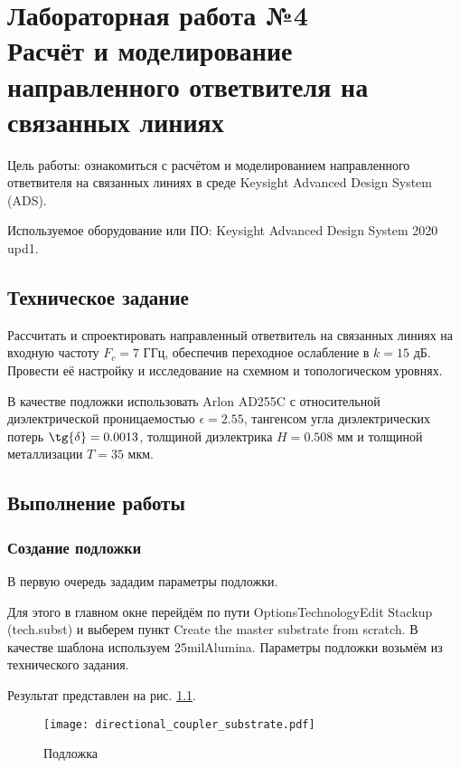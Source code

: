\chapter{Лабораторная работа №4 \\
Расчёт и моделирование направленного ответвителя на связанных линиях}

Цель работы: ознакомиться с расчётом и моделированием направленного ответвителя на связанных линиях в среде Keysight Advanced Design System (ADS).

Используемое оборудование или ПО: Keysight Advanced Design System 2020 upd1.

\section{Техническое задание}

Рассчитать и спроектировать направленный ответвитель на связанных линиях на входную частоту $F_c = 7 \text{~ГГц}$, обеспечив переходное ослабление в $k = 15 \text{~дБ}$.
Провести её настройку и исследование на схемном и топологическом уровнях.

В качестве подложки использовать Arlon AD255C с относительной диэлектрической проницаемостью $\epsilon = 2.55$, тангенсом угла диэлектрических потерь $\tg{\delta} = 0.0013$, толщиной диэлектрика $H = 0.508 \text{~мм}$ и толщиной металлизации $T = 35 \text{~мкм}$.

\section{Выполнение работы}

\subsection{Создание подложки}

В первую очередь зададим параметры подложки.

Для этого в главном окне перейдём по пути Options\textrightarrow Technology\textrightarrow Edit Stackup (tech.subst) и выберем пункт Create the master substrate from scratch.
В качестве шаблона используем 25milAlumina.
Параметры подложки возьмём из технического задания.

Результат представлен на рис. \ref{fig:directional_coupler_substrate}.

\begin{figure}
    \centering
    \texttt{[image: directional\_coupler\_substrate.pdf]}
    \caption{Подложка}
    \label{fig:directional_coupler_substrate}
\end{figure}

